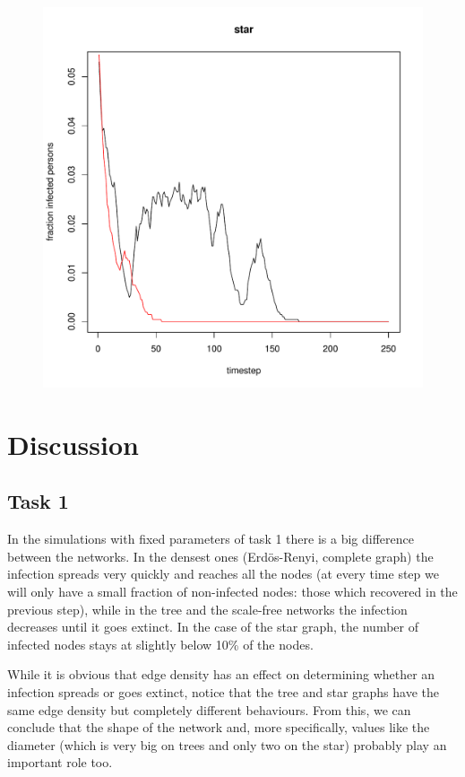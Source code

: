 \documentclass[paper=a4, fontsize=11pt]{scrartcl} %
\begin{document}
\begin{figure}[htbp] %
   \centering
   \includegraphics[width=\textwidth]{thresholdSimulation_star} 
   \label{star}
\end{figure}

\section{Discussion}
\subsection{Task 1}
In the simulations with fixed parameters of task 1 there is a big difference between the networks. In the densest ones (Erdös-Renyi, complete graph) the infection spreads very quickly and reaches all the nodes (at every time step we will only have a small fraction of non-infected nodes: those which recovered in the previous step), while in the tree and the scale-free networks the infection decreases until it goes extinct. In the case of the star graph, the number of infected nodes stays at slightly below 10\% of the nodes.

While it is obvious that edge density has an effect on determining whether an infection spreads or goes extinct, notice that the tree and star graphs have the same edge density but completely different behaviours. From this, we can conclude that the shape of the network and, more specifically, values like the diameter (which is very big on trees and only two on the star) probably play an important role too.
\end{document}
